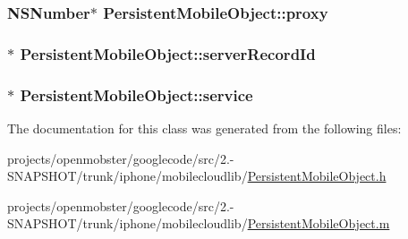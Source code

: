 \label{interface_persistent_mobile_object_afa80219f03e1f03aac075e51137ad17f}
\hypertarget{interface_persistent_mobile_object_a9ed51cfff2cf5faa1f68f844986fd182}{
\subsubsection[{proxy}]{\setlength{\rightskip}{0pt plus 5cm}\-N\-S\-Number$\ast$ \-Persistent\-Mobile\-Object\-::proxy}}
\label{interface_persistent_mobile_object_a9ed51cfff2cf5faa1f68f844986fd182}
\hypertarget{interface_persistent_mobile_object_aec81aad76e60d28de01d234960ec5344}{
\subsubsection[{server\-Record\-Id}]{$\ast$ \-Persistent\-Mobile\-Object\-::server\-Record\-Id}}
\label{interface_persistent_mobile_object_aec81aad76e60d28de01d234960ec5344}
\hypertarget{interface_persistent_mobile_object_a51ce80ff0ce56b4db78017219f35786d}{
\subsubsection[{service}]{$\ast$ \-Persistent\-Mobile\-Object\-::service}}
\label{interface_persistent_mobile_object_a51ce80ff0ce56b4db78017219f35786d}


\-The documentation for this class was generated from the following files\-:\begin{DoxyCompactItemize}
\item 
projects/openmobster/googlecode/src/2.-\/\-S\-N\-A\-P\-S\-H\-O\-T/trunk/iphone/mobilecloudlib/\hyperlink{_persistent_mobile_object_8h}{\-Persistent\-Mobile\-Object.\-h}\item 
projects/openmobster/googlecode/src/2.-\/\-S\-N\-A\-P\-S\-H\-O\-T/trunk/iphone/mobilecloudlib/\hyperlink{_persistent_mobile_object_8m}{\-Persistent\-Mobile\-Object.\-m}\end{DoxyCompactItemize}

